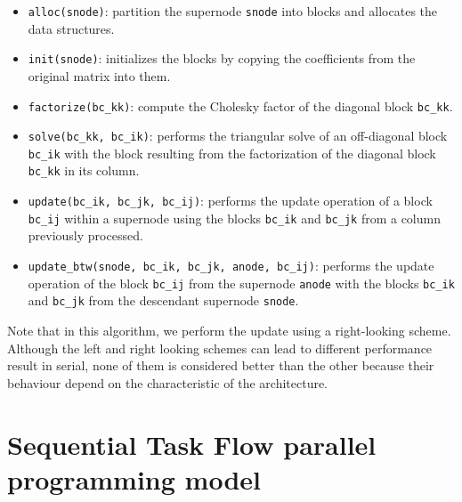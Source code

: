 \documentclass{article}
\begin{document}
\begin{itemize}
\item \texttt{alloc(snode)}: partition the supernode \texttt{snode}
  into blocks and allocates the data structures.
\item \texttt{init(snode)}: initializes the blocks by copying the
  coefficients from the original matrix into them.
\item \texttt{factorize(bc\_kk)}: compute the Cholesky factor of the
  diagonal block \texttt{bc\_kk}.
\item \texttt{solve(bc\_kk, bc\_ik)}: performs the triangular solve of
  an off-diagonal block \texttt{bc\_ik} with the block resulting from
  the factorization of the diagonal block \texttt{bc\_kk} in its
  column.
\item \texttt{update(bc\_ik, bc\_jk, bc\_ij)}: performs the update
  operation of a block \texttt{bc\_ij} within a supernode using the
  blocks \texttt{bc\_ik} and \texttt{bc\_jk} from a column previously
  processed.
\item \texttt{update\_btw(snode, bc\_ik, bc\_jk, anode, bc\_ij)}:
  performs the update operation of the block \texttt{bc\_ij} from the
  supernode \texttt{anode} with the blocks \texttt{bc\_ik} and
  \texttt{bc\_jk} from the descendant supernode \texttt{snode}.
\end{itemize}

Note that in this algorithm, we perform the update using a
right-looking scheme. Although the left and right looking schemes can
lead to different performance result in serial, none of them is
considered better than the other because their behaviour depend on the
characteristic of the architecture.
 
\section{Sequential Task Flow parallel programming model}\label{sec:stf-model}
\end{document}
